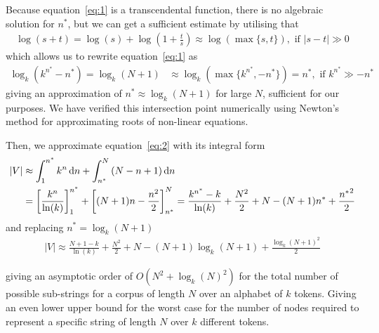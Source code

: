 Because equation~\ref{eq:1} is a transcendental function, there is no algebraic solution for $n^*$, but we can get a sufficient estimate by utilising that
\begin{align*}
    \log(s + t) = \log(s) + \log(1 + \frac{t}{s}) \approx \log(\max\{s, t\}), \text{ if } |s - t| \gg 0
\end{align*}
\noindent
which allows us to rewrite equation~\ref{eq:1} as 
\begin{align*}
    \log_k(k^{n^*} - n^*) = \log_k(N + 1) &\approx \log_k(\max\{k^{n^*}, - n^*\}) = n^*, \text{ if } k^{n^*} \gg -n^*
\end{align*}
giving an approximation of $n^* \approx \log_k(N + 1)$ for large $N$, sufficient for our purposes. We have verified this intersection point numerically using Newton's method for approximating roots of non-linear equations.

\noindent
Then, we approximate equation~\ref{eq:2} with its integral form
\begin{align*}
    |V| &\approx \int_{1}^{n^*}{k^n}\mathop{}\!\mathrm{d} n + \int_{n^*}^{N}{\left(N - n + 1\right)}\mathop{}\!\mathrm{d} n\\
        &= {\left[\frac{k^n}{\ln(k)} \right]}_{1}^{n^*} + {\left[(N + 1)n - \frac{n^2}{2} \right]}_{n^*}^{N}
        = \frac{k^{n^*} - k}{\ln(k)} + \frac{N^2}{2} + N - (N + 1)n^* + \frac{{n^*}^2}{2}
\end{align*}
and replacing $n^* = \log_k(N + 1)$
\begin{align*}
    |V| \approx \frac{N + 1 - k}{\ln(k)} + \frac{N^2}{2} + N - (N + 1)\log_k(N + 1) + \frac{{\log_k(N+1)}^2}{2}
\end{align*}

giving an asymptotic order of $O(N^2 + \log_k(N)^2)$ for the total number of possible sub-strings for a corpus of length $N$ over an alphabet of $k$ tokens. Giving an even lower upper bound for the worst case for the number of nodes required to represent a specific string of length $N$ over $k$ different tokens.

